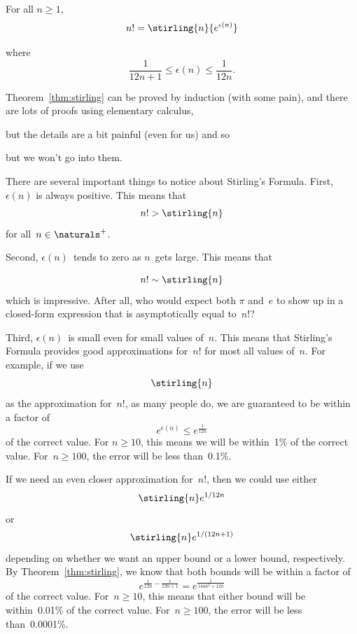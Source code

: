\begin{theorem}\label{thm:stirling}
For all $n \ge 1$,
\[
    n! = \stirling{n}{e^{\epsilon(n)}}
\]

where
\[
    \frac{1}{12 n + 1} \le \epsilon(n) \le \frac{1}{12n}.
\]
\end{theorem}

Theorem~\ref{thm:stirling} can be proved by induction (with some pain),
and there are lots of proofs using elementary
calculus,
\begin{editingnotes}
but the details are a bit painful (even for us) and so
\end{editingnotes}
but we won't go into them.

There are several important things to notice about Stirling's
Formula.  First, $\epsilon(n)$ is always positive.  This means that
\begin{equation}\label{eqn:9ZA}
    n! > \stirling{n}
\end{equation}
for all~$n \in \naturals^+$.

Second, $\epsilon(n)$~tends to zero as $n$~gets large.  This means
that

\begin{equation}\label{nfacsim}%
    n! \sim \stirling{n}
\end{equation}
which is impressive.  After all, who would expect both $\pi$ and~$e$ to
show up in a closed-form expression that is asymptotically equal to~$n!$?

Third, $\epsilon(n)$~is small even for small values of~$n$.  This
means that Stirling's Formula provides good approximations for~$n!$
for most all values of~$n$.  For example, if we use
\[
    \stirling{n}
\]
as the approximation for~$n!$, as many people do, we are guaranteed
to be within a factor of
\[
    e^{\epsilon(n)} \le e^{\frac{1}{12n}}
\]
of the correct value.  For $n \ge 10$, this means we will be
within~1\% of the correct value.  For~$n \ge 100$, the error will be
less than~0.1\%.

If we need an even closer approximation for~$n!$, then we could use
either
\[
    \stirling{n} e^{1/12n}
\]
or
\[
    \stirling{n} e^{1/(12n + 1)}
\]
depending on whether we want an upper bound or a lower bound,
respectively.  By Theorem~\ref{thm:stirling}, we know that both bounds
will be within a factor of
\[
    e^{ \frac{1}{12n} - \frac{1}{12n + 1} } = e^{\frac{1}{144n^2 + 12n }}
\]
of the correct value.  For~$n \ge 10$, this means that either bound
will be within~0.01\% of the correct value.  For~$n \ge 100$, the
error will be less than~0.0001\%.

